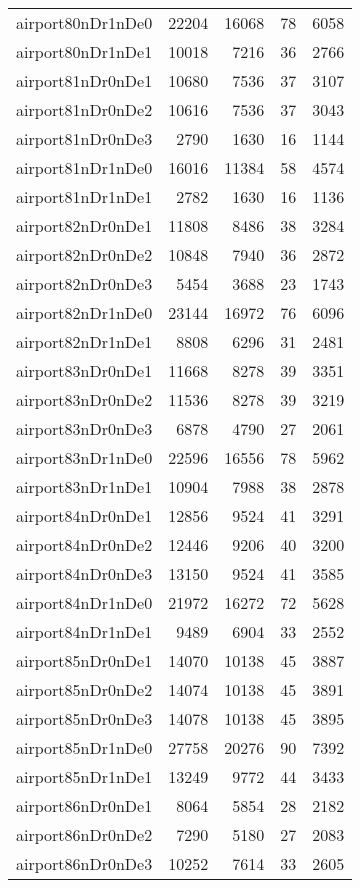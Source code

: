 \begin{tabular}{lrrrr}
airport80nDr1nDe0 & 22204 & 16068 & 78 & 6058 \\
airport80nDr1nDe1 & 10018 & 7216 & 36 & 2766 \\
airport81nDr0nDe1 & 10680 & 7536 & 37 & 3107 \\
airport81nDr0nDe2 & 10616 & 7536 & 37 & 3043 \\
airport81nDr0nDe3 & 2790 & 1630 & 16 & 1144 \\
airport81nDr1nDe0 & 16016 & 11384 & 58 & 4574 \\
airport81nDr1nDe1 & 2782 & 1630 & 16 & 1136 \\
airport82nDr0nDe1 & 11808 & 8486 & 38 & 3284 \\
airport82nDr0nDe2 & 10848 & 7940 & 36 & 2872 \\
airport82nDr0nDe3 & 5454 & 3688 & 23 & 1743 \\
airport82nDr1nDe0 & 23144 & 16972 & 76 & 6096 \\
airport82nDr1nDe1 & 8808 & 6296 & 31 & 2481 \\
airport83nDr0nDe1 & 11668 & 8278 & 39 & 3351 \\
airport83nDr0nDe2 & 11536 & 8278 & 39 & 3219 \\
airport83nDr0nDe3 & 6878 & 4790 & 27 & 2061 \\
airport83nDr1nDe0 & 22596 & 16556 & 78 & 5962 \\
airport83nDr1nDe1 & 10904 & 7988 & 38 & 2878 \\
airport84nDr0nDe1 & 12856 & 9524 & 41 & 3291 \\
airport84nDr0nDe2 & 12446 & 9206 & 40 & 3200 \\
airport84nDr0nDe3 & 13150 & 9524 & 41 & 3585 \\
airport84nDr1nDe0 & 21972 & 16272 & 72 & 5628 \\
airport84nDr1nDe1 & 9489 & 6904 & 33 & 2552 \\
airport85nDr0nDe1 & 14070 & 10138 & 45 & 3887 \\
airport85nDr0nDe2 & 14074 & 10138 & 45 & 3891 \\
airport85nDr0nDe3 & 14078 & 10138 & 45 & 3895 \\
airport85nDr1nDe0 & 27758 & 20276 & 90 & 7392 \\
airport85nDr1nDe1 & 13249 & 9772 & 44 & 3433 \\
airport86nDr0nDe1 & 8064 & 5854 & 28 & 2182 \\
airport86nDr0nDe2 & 7290 & 5180 & 27 & 2083 \\
airport86nDr0nDe3 & 10252 & 7614 & 33 & 2605 \\

\end{tabular}
